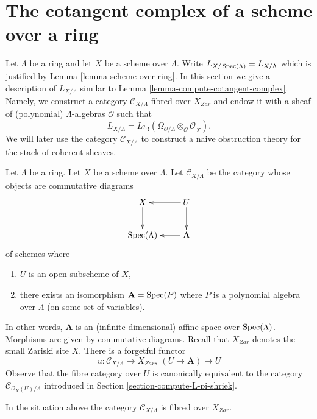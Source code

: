 \section{The cotangent complex of a scheme over a ring}
\label{section-cotangent-schemes-variant}

\noindent
Let $\Lambda$ be a ring and let $X$ be a scheme over $\Lambda$.
Write $L_{X/\mathop{\mathrm{Spec}}(\Lambda)} = L_{X/\Lambda}$ which is justified
by Lemma \ref{lemma-scheme-over-ring}.
In this section we give a description of $L_{X/\Lambda}$ similar to
Lemma \ref{lemma-compute-cotangent-complex}.
Namely, we construct a category $\mathcal{C}_{X/\Lambda}$
fibred over $X_{Zar}$ and endow it with a sheaf of (polynomial)
$\Lambda$-algebras $\mathcal{O}$ such that
$$
L_{X/\Lambda} =
L\pi_!(\Omega_{\mathcal{O}/\underline{\Lambda}} \otimes_\mathcal{O}
\underline{\mathcal{O}}_X).
$$
We will later use the category $\mathcal{C}_{X/\Lambda}$ to construct
a naive obstruction theory for the stack of coherent sheaves.

\medskip\noindent
Let $\Lambda$ be a ring. Let $X$ be a scheme over $\Lambda$.
Let $\mathcal{C}_{X/\Lambda}$ be the category whose objects are
commutative diagrams
\begin{equation}
\label{equation-object}
\vcenter{
\xymatrix{
X \ar[d] & U \ar[l] \ar[d] \\
\Spec(\Lambda) & \mathbf{A} \ar[l]
}
}
\end{equation}
of schemes where
\begin{enumerate}
\item $U$ is an open subscheme of $X$,
\item there exists an isomorphism $\mathbf{A} = \mathop{\mathrm{Spec}}(P)$
where $P$ is a polynomial algebra over $\Lambda$ (on some set
of variables).
\end{enumerate}
In other words, $\mathbf{A}$ is an (infinite dimensional) affine space over
$\mathop{\mathrm{Spec}}(\Lambda)$. Morphisms are given by commutative diagrams.
Recall that $X_{Zar}$ denotes the small Zariski site $X$.
There is a forgetful functor
$$
u : \mathcal{C}_{X/\Lambda} \to X_{Zar},\ (U \to \mathbf{A}) \mapsto U
$$
Observe that the fibre category over $U$ is canonically equivalent
to the category $\mathcal{C}_{\mathcal{O}_X(U)/\Lambda}$ introduced
in Section \ref{section-compute-L-pi-shriek}.

\begin{lemma}
\label{lemma-category-fibred}
In the situation above the category
$\mathcal{C}_{X/\Lambda}$ is fibred over $X_{Zar}$.
\end{lemma}

